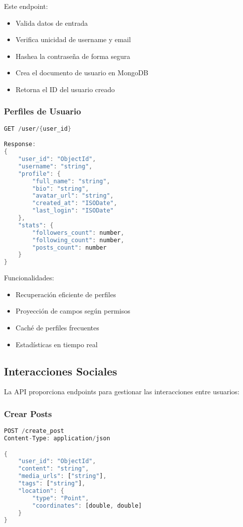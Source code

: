 \documentclass[12pt,letterpaper]{article}
\begin{document}
Este endpoint:
\begin{itemize}
    \item Valida datos de entrada
    \item Verifica unicidad de username y email
    \item Hashea la contraseña de forma segura
    \item Crea el documento de usuario en MongoDB
    \item Retorna el ID del usuario creado
\end{itemize}

\subsubsection{Perfiles de Usuario}
\begin{lstlisting}[language=rust]
GET /user/{user_id}

Response:
{
    "user_id": "ObjectId",
    "username": "string",
    "profile": {
        "full_name": "string",
        "bio": "string",
        "avatar_url": "string",
        "created_at": "ISODate",
        "last_login": "ISODate"
    },
    "stats": {
        "followers_count": number,
        "following_count": number,
        "posts_count": number
    }
}
\end{lstlisting}

Funcionalidades:
\begin{itemize}
    \item Recuperación eficiente de perfiles
    \item Proyección de campos según permisos
    \item Caché de perfiles frecuentes
    \item Estadísticas en tiempo real
\end{itemize}

\subsection{Interacciones Sociales}
La API proporciona endpoints para gestionar las interacciones entre usuarios:

\subsubsection{Crear Posts}
\begin{lstlisting}[language=rust]
POST /create_post
Content-Type: application/json

{
    "user_id": "ObjectId",
    "content": "string",
    "media_urls": ["string"],
    "tags": ["string"],
    "location": {
        "type": "Point",
        "coordinates": [double, double]
    }
}
\end{lstlisting}
\end{document}
